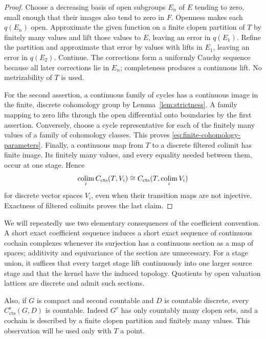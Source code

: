 \begin{proof}
Choose a decreasing basis of open subgroups $E_n$ of $E$ tending to
zero, small enough that their images also tend to zero in $F$.
Openness makes each $q(E_n)$ open.  Approximate the given function on
a finite clopen partition of $T$ by finitely many values and lift those
values to $E$, leaving an error in $q(E_1)$.  Refine the partition and
approximate that error by values with lifts in $E_1$, leaving an error
in $q(E_2)$.  Continue.  The corrections form a uniformly Cauchy
sequence because all later corrections lie in $E_n$; completeness
produces a continuous lift.  No metrizability of $T$ is used.

For the second assertion, a continuous family of cycles has a
continuous image in the finite, discrete cohomology group by
Lemma~\ref{lem:strictness}.  A family mapping to zero lifts through
the open differential onto boundaries by the first assertion.
Conversely, choose a cycle representative for each of the finitely
many values of a family of cohomology classes.  This proves
\eqref{eq:finite-cohomology-parameters}.  Finally, a continuous map
from $T$ to a discrete filtered colimit has finite image.  Its finitely
many values, and every equality needed between them, occur at one
stage.  Hence
\[
 \operatorname*{colim}_i C_{\mathrm{cts}}(T,V_i)
 \cong C_{\mathrm{cts}}(T,\operatorname*{colim}_i V_i)
\]
for discrete vector spaces $V_i$, even when their transition maps are
not injective.  Exactness of filtered colimits proves the last claim.
\end{proof}

We will repeatedly use two elementary consequences of the coefficient
convention.  A short exact coefficient sequence induces a short exact
sequence of continuous cochain complexes whenever its surjection has
a continuous section as a map of spaces; additivity and equivariance
of the section are unnecessary.  For a stage union, it suffices that
every target stage lift continuously into one larger source stage and
that the kernel have the induced topology.  Quotients by open
valuation lattices are discrete and admit such sections.

Also, if $G$ is compact and second countable and $D$ is countable
discrete, every $C^r_{\mathrm{cts}}(G,D)$ is countable.  Indeed $G^r$
has only countably many clopen sets, and a cochain is described by a
finite clopen partition and finitely many values.  This observation
will be used only with $T$ a point.

